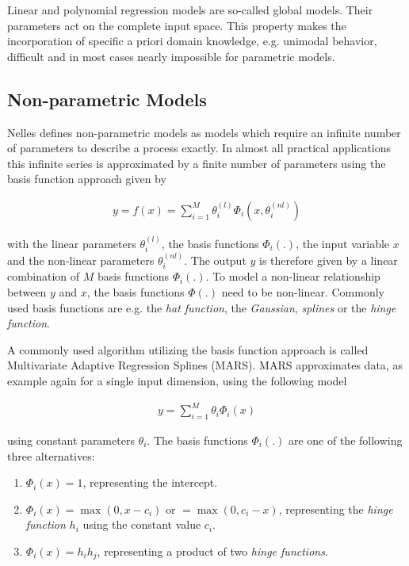 \documentclass[10pt,a4paper]{article}
\begin{document}
Linear and polynomial regression models are so-called global models. Their parameters act on the complete input space. This property makes the incorporation of specific a priori domain knowledge, e.g. unimodal behavior, difficult and in most cases nearly impossible for parametric models. 

\subsection{Non-parametric Models}

Nelles defines non-parametric models as models which require an infinite number of parameters to describe a process exactly. \cite{nelles2013nonlinear} In almost all practical applications this infinite series is approximated by a finite number of parameters using the basis function approach given by

\begin{align} \label{eq:basis-function-approach}
	y = f(x) = \sum_{i=1}^M \theta_i^{(l)} \Phi_i(x, \theta_i^{(nl)})
\end{align} 

with the linear parameters $\theta_i^{(l)}$, the basis functions $\Phi_i(.)$, the input variable $x$ and the non-linear parameters $\theta_i^{(nl)}$. The output $y$ is therefore given by a linear combination of $M$ basis functions $\Phi_i(.)$. To model a non-linear relationship between $y$ and $x$, the basis functions $\Phi(.)$ need to be non-linear. Commonly used basis functions are e.g. the \emph{hat function}, the \emph{Gaussian}, \emph{splines} or the \emph{hinge function}. 

A commonly used algorithm utilizing the basis function approach is called Multivariate Adaptive Regression Splines (MARS). \cite{friedman1991multivariate} MARS approximates data, as example again for a single input dimension, using the following model

\begin{align} \label{eq:MARS}
	y = \sum_{i=1}^M \theta_i \Phi_i(x)
\end{align}

using constant parameters $\theta_i$. The basis functions $\Phi_i(.)$ are one of the following three alternatives:

\begin{enumerate}
	\item $\Phi_i(x) = 1$, representing the intercept.
	\item $\Phi_i(x) = \max(0, x - c_i)$ or $= \max(0, c_i - x)$, representing the \emph{hinge function} $h_i$ using the constant value $c_i$.
	\item $\Phi_i(x) = h_i  h_j$, representing a product of two \emph{hinge functions}.
\end{enumerate}
\end{document}
